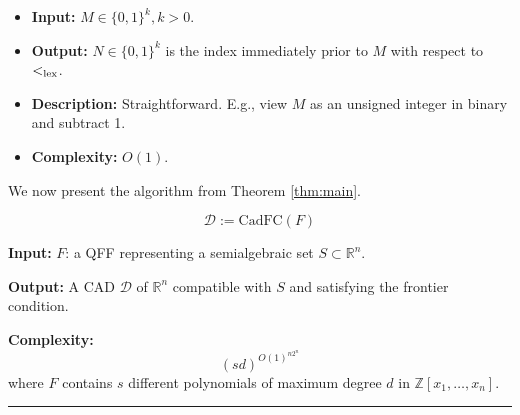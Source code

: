 \documentclass[
]{book}
\providecommand{\tightlist}{%
  \setlength{\itemsep}{0pt}\setlength{\parskip}{0pt}}
\theoremstyle{definition}
\theoremstyle{definition}
\theoremstyle{definition}
\theoremstyle{definition}
\theoremstyle{remark}
\begin{document}
\begin{itemize}
  \begin{itemize}
  \tightlist
  \item
    \textbf{Input:} \(M \in \{0,1\}^k, k > 0\).
  \item
    \textbf{Output:} \(N \in \{0,1\}^k\) is the index immediately prior to \(M\) with respect to \(<_{\rm{lex}}\).
  \item
    \textbf{Description:} Straightforward. E.g., view \(M\) as an unsigned integer in binary and subtract 1.
  \item
    \textbf{Complexity:} \(O(1)\).
  \end{itemize}
\end{itemize}

We now present the algorithm from Theorem \ref{thm:main}.

\leavevmode\hypertarget{algorithm-main}{}%
\[
{\mathcal D} := \mathrm{CadFC}(F)
\]

\textbf{Input:}
\(F\): a QFF representing a semialgebraic set \(S \subset \mathbb{R}^n\).

\textbf{Output:}
A CAD \(\mathcal D\) of \(\mathbb{R}^n\) compatible with \(S\) and satisfying the frontier condition.

\textbf{Complexity:}
\[(sd)^{O(1)^{n2^n}}\]
where \(F\) contains \(s\) different polynomials of maximum degree \(d\) in \(\mathbb{Z}[x_1,\ldots,x_n]\).

\begin{center}\rule{0.5\linewidth}{0.5pt}\end{center}
\end{document}
